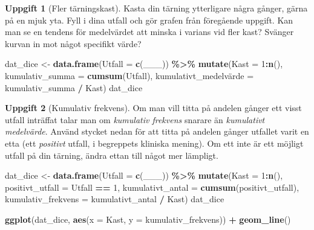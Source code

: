 \documentclass[
]{book}
\newenvironment{Shaded}{\begin{snugshade}}{\end{snugshade}}
\newcommand{\AttributeTok}[1]{\textcolor[rgb]{0.13,0.29,0.53}{#1}}
\newcommand{\DecValTok}[1]{\textcolor[rgb]{0.00,0.00,0.81}{#1}}
\newcommand{\FunctionTok}[1]{\textcolor[rgb]{0.13,0.29,0.53}{\textbf{#1}}}
\newcommand{\NormalTok}[1]{#1}
\newcommand{\OtherTok}[1]{\textcolor[rgb]{0.56,0.35,0.01}{#1}}
\newcommand{\SpecialCharTok}[1]{\textcolor[rgb]{0.81,0.36,0.00}{\textbf{#1}}}
\theoremstyle{definition}
\theoremstyle{definition}
\theoremstyle{definition}
\newtheorem{exercise}{Uppgift}[chapter]
\theoremstyle{definition}
\theoremstyle{remark}
\begin{document}
\begin{exercise}[Fler tärningskast]

Kasta din tärning ytterligare några gånger, gärna på en mjuk yta. Fyll i dina utfall och gör grafen från föregående uppgift. Kan man se en tendens för medelvärdet att minska i varians vid fler kast? Svänger kurvan in mot något specifikt värde?

\begin{Shaded}
\begin{Highlighting}[]
\NormalTok{dat\_dice }\OtherTok{\textless{}{-}} \FunctionTok{data.frame}\NormalTok{(}\AttributeTok{Utfall =} \FunctionTok{c}\NormalTok{(\_\_\_)) }\SpecialCharTok{\%\textgreater{}\%} 
  \FunctionTok{mutate}\NormalTok{(}\AttributeTok{Kast =} \DecValTok{1}\SpecialCharTok{:}\FunctionTok{n}\NormalTok{(),                                 }
         \AttributeTok{kumulativ\_summa =} \FunctionTok{cumsum}\NormalTok{(Utfall),           }
\NormalTok{         kumulativt\_medelvärde }\OtherTok{=}\NormalTok{ kumulativ\_summa }\SpecialCharTok{/}\NormalTok{ Kast)}
\NormalTok{dat\_dice}
\end{Highlighting}
\end{Shaded}

\end{exercise}

\begin{exercise}[Kumulativ frekvens]

Om man vill titta på andelen gånger ett visst utfall inträffat talar man om \emph{kumulativ frekvens} snarare än \emph{kumulativt medelvärde}. Använd stycket nedan för att titta på andelen gånger utfallet varit en etta (ett \emph{positivt} utfall, i begreppets kliniska mening). Om ett inte är ett möjligt utfall på din tärning, ändra ettan till något mer lämpligt.

\begin{Shaded}
\begin{Highlighting}[]
\NormalTok{dat\_dice }\OtherTok{\textless{}{-}} \FunctionTok{data.frame}\NormalTok{(}\AttributeTok{Utfall =} \FunctionTok{c}\NormalTok{(\_\_\_)) }\SpecialCharTok{\%\textgreater{}\%} 
  \FunctionTok{mutate}\NormalTok{(}\AttributeTok{Kast =} \DecValTok{1}\SpecialCharTok{:}\FunctionTok{n}\NormalTok{(),}
         \AttributeTok{positivt\_utfall =}\NormalTok{ Utfall }\SpecialCharTok{==} \DecValTok{1}\NormalTok{,              }
         \AttributeTok{kumulativt\_antal =} \FunctionTok{cumsum}\NormalTok{(positivt\_utfall),}
         \AttributeTok{kumulativ\_frekvens =}\NormalTok{ kumulativt\_antal }\SpecialCharTok{/}\NormalTok{ Kast)}
\NormalTok{dat\_dice}

\FunctionTok{ggplot}\NormalTok{(dat\_dice, }\FunctionTok{aes}\NormalTok{(}\AttributeTok{x =}\NormalTok{ Kast, }\AttributeTok{y =}\NormalTok{ kumulativ\_frekvens)) }\SpecialCharTok{+}
  \FunctionTok{geom\_line}\NormalTok{()}
\end{Highlighting}
\end{Shaded}

\end{exercise}
\end{document}
